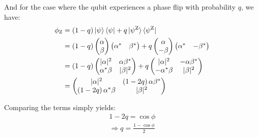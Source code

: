 \begin{parts}
	And for the case where the qubit experiences a phase flip with probability $q$, we have:
	\begin{align*}
		\phi_\textnormal{Z} &= \left(1-q\right) \ket{\psi}\bra{\psi} + q \ket{\psi^\textnormal{Z}}\bra{\psi^\textnormal{Z}} \\
		&= \left(1-q\right) \begin{pmatrix}
			\alpha \\ \beta
		\end{pmatrix}
		\begin{pmatrix}
			\alpha^* & \beta^*
		\end{pmatrix}
		+ q \begin{pmatrix}
			\alpha \\ -\beta
		\end{pmatrix}
		\begin{pmatrix}
			\alpha^* & -\beta^*
		\end{pmatrix} \\
		&= \left(1-q\right) \begin{pmatrix}
			|\alpha|^2 & \alpha \beta^* \\
			\alpha^* \beta & |\beta|^2
		\end{pmatrix}
		+ q \begin{pmatrix}
			|\alpha|^2 & -\alpha \beta^* \\
			-\alpha^* \beta & |\beta|^2
		\end{pmatrix} \\
		&= \begin{pmatrix}
			|\alpha|^2 & \left(1-2q\right) \alpha \beta^* \\
			\left(1-2q\right) \alpha^* \beta & |\beta|^2
		\end{pmatrix}
	\end{align*}
	
	Comparing the terms simply yields:
	\begin{gather*}
		1-2q = \cos\phi \\
		\Rightarrow q = \frac{1-\cos\phi}{2}
	\end{gather*}
\end{parts}